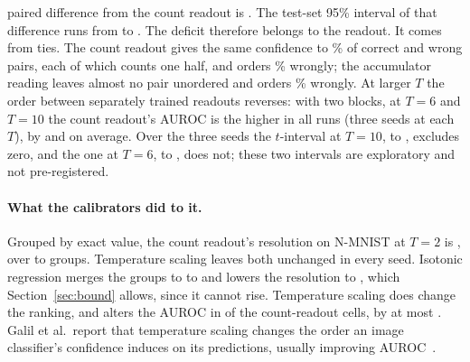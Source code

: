 \documentclass[10pt]{article}
\begin{document}
paired difference from the count readout is \swrAurocDiff. The test-set 95\% interval of that %
difference runs from \swrAurocDiffLo{} to \swrAurocDiffHi. The deficit therefore belongs to the readout. It comes from %
ties. The count readout gives the same confidence to \pairsCountTied\% of correct and wrong %
pairs, each of which counts one half, and orders \pairsCountReversed\% wrongly; the accumulator %
reading leaves almost no pair unordered and orders \pairsAccSwReversed\% wrongly. At larger $T$ the order between %
separately trained readouts reverses: with two blocks, at $T=6$ and $T=10$ the count readout's
AUROC is the higher in all \aurocSeedsSixTen{} runs (three seeds at each $T$), by \aurocDiffSix{} and \aurocDiffTen{} on %
average. Over the three seeds the $t$-interval at $T=10$, \aurocDiffTenTLo{} to \aurocDiffTenTHi, %
excludes zero, and the one at $T=6$, \aurocDiffSixTLo{} to \aurocDiffSixTHi, does not; these two
intervals are exploratory and not pre-registered. %

\paragraph{What the calibrators did to it.} Grouped by exact value, the count readout's
resolution on N-MNIST at $T=2$ is \resCountExact, over \groupsCountExactMin{} to %
\groupsCountExactMax{} groups. Temperature scaling leaves both unchanged in every seed. Isotonic %
regression merges the groups to \groupsCountIsoMin{} to \groupsCountIsoMax{} and lowers the %
resolution to \resCountExactIso, which Section~\ref{sec:bound} allows, since it cannot rise. Temperature scaling does %
change the ranking, and alters the AUROC in \aurocMovedCells{} of the \aurocCells{} count-readout %
cells, by at most \aurocMovedMax. Galil et al.\ report that temperature scaling changes the %
order an image classifier's confidence induces on its predictions, usually improving
AUROC~\citep{galil2023selective}. %
\end{document}
